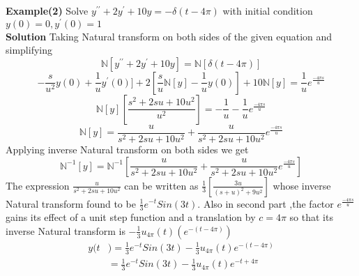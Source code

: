 \newpage
\textbf{Example(2)} Solve $y^{\prime\prime}+2y^{\prime}+10y=-\delta(t-4\pi)$ with initial condition $y(0)=0,y^{\prime}(0)=1$\\
\textbf{Solution} 
Taking Natural transform on both sides of the given equation and simplifying
\begin{equation*}
\mathbb{N}[y^{\prime\prime}+2y^{\prime}+10y]=\mathbb{N}[\delta(t-4\pi)]
\end{equation*}
\begin{equation*}
[\frac{s^2}{u^2}\mathbb{N}[y]-\frac{s}{u^2}y(0)+\frac{1}{u}y^{\prime}(0)]+2[\frac{s}{u}\mathbb{N}[y]-\frac{1}{u}y(0)]+10\mathbb{N}[y]=\frac{1}{u}e^{\frac{-4\pi s}{u}}
\end{equation*}
\begin{equation*}
\mathbb{N}[y][\frac{s^2+2su+10u^2}{u^2}]=-\frac{1}{u}-\frac{1}{u}e^{\frac{-4\pi s}{u}}
\end{equation*}
\begin{equation*}
\mathbb{N}[y]=\frac{u}{s^2+2su+10u^2}+\frac{u}{s^2+2su+10u^2}e^{\frac{-4\pi s}{u}}
\end{equation*}
Applying inverse Natural transform on both sides we get
\begin{equation}
\mathbb{N}^{-1}[y]=\mathbb{N}^{-1}[\frac{u}{s^2+2su+10u^2}+\frac{u}{s^2+2su+10u^2}e^{\frac{-4\pi s}{u}}]
\end{equation}
The expression $ \frac{u}{s^2+2su+10u^2} $ can be written as $\frac{1}{3}[\frac{3u}{(s+u)^{2}+9u^{2}}]$ whose inverse Natural transform found to be $ \frac{1}{3}e^{-t}Sin(3t) $. Also in second part ,the factor $ e^{\frac{-4\pi s}{u}} $ gains its effect of a unit step function and a translation by $c=4\pi $ so that its inverse Natural transform is $ -\frac{1}{3}u_{4\pi}(t)(e^{-(t-4\pi)}) $
\begin{align*}
y(t&)=\frac{1}{3}e^{-t}Sin(3t)-\frac{1}{3}u_{4\pi}(t)e^{-(t-4\pi)}\\
&=\frac{1}{3}e^{-t}Sin(3t)-\frac{1}{3}u_{4\pi}(t)e^{-t+4\pi}
\end{align*}


